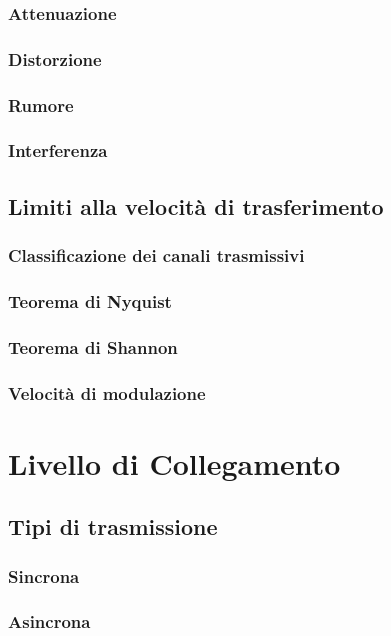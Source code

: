 \documentclass[a4paper,11pt]{paper}
\begin{document}
\subsubsection{Attenuazione}
\subsubsection{Distorzione}
\subsubsection{Rumore}
\subsubsection{Interferenza}

\subsection{Limiti alla velocità di trasferimento}
\subsubsection{Classificazione dei canali trasmissivi}
\subsubsection{Teorema di Nyquist}
\subsubsection{Teorema di Shannon}
\subsubsection{Velocità di modulazione}

\newpage
\section{Livello di Collegamento}

\subsection{Tipi di trasmissione}
\subsubsection{Sincrona}
\subsubsection{Asincrona}
\end{document}
